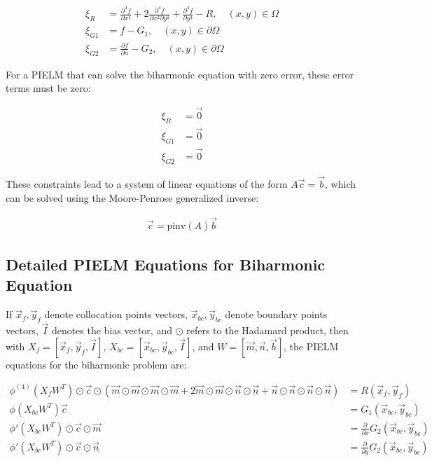 \documentclass[11pt]{article}
\begin{document}
\begin{align}
\xi_R &= \frac{\partial^4 f}{\partial x^4} + 2\frac{\partial^4 f}{\partial x^2 \partial y^2} + \frac{\partial^4 f}{\partial y^4} - R, \quad (x,y) \in \Omega\\
\xi_{G1} &= f - G_1, \quad (x,y) \in \partial\Omega\\
\xi_{G2} &= \frac{\partial f}{\partial n} - G_2, \quad (x,y) \in \partial\Omega
\end{align}

For a PIELM that can solve the biharmonic equation with zero error, these error terms must be zero:

\begin{align}
\xi_R &= \vec{0}\\
\xi_{G1} &= \vec{0}\\
\xi_{G2} &= \vec{0}
\end{align}

These constraints lead to a system of linear equations of the form $A\vec{c} = \vec{b}$, which can be solved using the Moore-Penrose generalized inverse:

\begin{align}
\vec{c} = \text{pinv}(A)\vec{b}
\end{align}

\subsection{Detailed PIELM Equations for Biharmonic Equation}

If $\vec{x}_f, \vec{y}_f$ denote collocation points vectors, $\vec{x}_{bc}, \vec{y}_{bc}$ denote boundary points vectors, $\vec{I}$ denotes the bias vector, and $\odot$ refers to the Hadamard product, then with $X_f = [\vec{x}_f, \vec{y}_f, \vec{I}]$, $X_{bc} = [\vec{x}_{bc}, \vec{y}_{bc}, \vec{I}]$, and $W = [\vec{m}, \vec{n}, \vec{b}]$, the PIELM equations for the biharmonic problem are:

\begin{align}
\phi^{(4)}(X_f W^T) \odot \vec{c} \odot (\vec{m} \odot \vec{m} \odot \vec{m} \odot \vec{m} + 2\vec{m} \odot \vec{m} \odot \vec{n} \odot \vec{n} + \vec{n} \odot \vec{n} \odot \vec{n} \odot \vec{n}) &= R(\vec{x}_f, \vec{y}_f)\\
\phi(X_{bc}W^T)\vec{c} &= G_1(\vec{x}_{bc}, \vec{y}_{bc})\\
\phi'(X_{bc}W^T) \odot \vec{c} \odot \vec{m} &= \frac{\partial}{\partial x}G_2(\vec{x}_{bc}, \vec{y}_{bc})\\
\phi'(X_{bc}W^T) \odot \vec{c} \odot \vec{n} &= \frac{\partial}{\partial y}G_2(\vec{x}_{bc}, \vec{y}_{bc})
\end{align}
\end{document}
